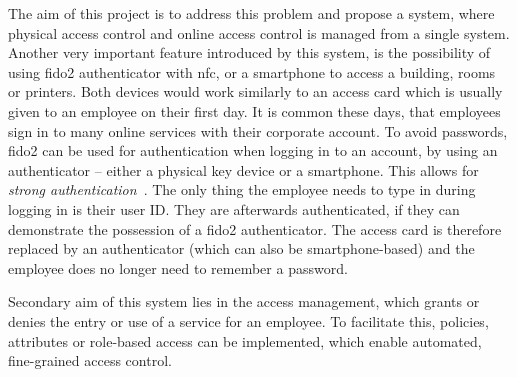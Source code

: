 The aim of this project is to address this problem and propose a system, where physical access control and online access control is managed from a single system. Another very important feature introduced by this system, is the possibility of using \acrshort{fido}2 authenticator with \acrshort{nfc}, or a smartphone to access a building, rooms or printers. Both devices would work similarly to an access card which is usually given to an employee on their first day. It is common these days, that employees sign in to many online services with their corporate account. To avoid passwords, \acrshort{fido}2 can be used for authentication when logging in to an account, by using an authenticator -- either a physical key device or a smartphone. This allows for \textit{strong authentication}~\cite{McDowell2017WhyAlliance}. The only thing the employee needs to type in during logging in is their user ID. They are afterwards authenticated, if they can demonstrate the possession of a \acrshort{fido}2 authenticator. The access card is therefore replaced by an authenticator (which can also be smartphone-based) and the employee does no longer need to remember a password.

Secondary aim of this system lies in the access management, which grants or denies the entry or use of a service for an employee. To facilitate this, policies, attributes or role-based access can be implemented, which enable automated, fine-grained access control.





